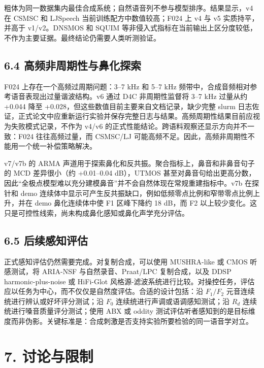 粗体为同一数据集内最佳合成系统；自然语音列不参与模型排序。结果显示，v4
在 CSMSC 和 LJSpeech 当前训练配方中数值较高；F024 上 v4 与 v5
实质持平，并高于 v1/v2。DNSMOS 和 SQUIM
等非侵入式指标在当前输出上区分度较低，不作为主要证据。最终结论仍需要人类听测验证。

\subsection{6.4
高频非周期性与鼻化探索}\label{ux9ad8ux9891ux975eux5468ux671fux6027ux4e0eux9f3bux5316ux63a2ux7d22}

F024 上存在一个高频过周期问题：3--7 kHz 和 5--7 kHz
频带中，合成音频相对参考语音表现出过量谐波结构。v6 通过 D4C
非周期性监督将 3--7 kHz 过量从约 +0.044 降至
+0.028，但这些数值目前主要来自文档记录，缺少完整 slurm
日志佐证，正式论文中应重新运行实验并保存完整日志与结果。高频周期性结果目前应视为失败模式记录，不作为
v4/v6 的正式性能结论。跨语料观察还显示方向并不一致：F024
往往高频过量，而 CSMSC/LJ
可能高频不足。因此，高频非周期性不能用一个统一补偿策略解决。

v7/v7b 的 ARMA 声道用于探索鼻化和反共振。聚合指标上，鼻音和非鼻音句子的
MCD 差异很小（约 +0.01--0.04 dB），UTMOS
甚至对鼻音句给出更高分数，因此``全极点模型难以充分建模鼻音''并不会自然体现在常规重建指标中。v7b
在探针和 demo
连续体中显示可产生反共振缺口，例如低频零点比例和窄带零点比例上升，并在
demo 鼻化连续体中使 F1 区峰下降约 18 dB，而 F2
以上较少变化。这只是可控性线索，尚未构成鼻化感知或鼻化声学充分评估。

\subsection{6.5
后续感知评估}\label{ux540eux7eedux611fux77e5ux8bc4ux4f30}

正式感知评估仍然需要完成。对复制合成，可以使用 MUSHRA-like 或 CMOS
听感测试，将 ARIA-NSF 与自然录音、Praat/LPC 复制合成，以及 DDSP
harmonic-plus-noise 或 HiFi-Glot
风格源-滤波系统进行比较。对操控任务，评估应以任务为中心，而不仅仅是自然度评估。合适的设计包括：沿
\(F_1/F_2\) 元音连续统进行辨认或好坏评分测试；沿 \(F_0\)
连续统进行声调或语调感知测试；沿 \(R_d\)
连续统进行嗓音质量评分测试；使用 ABX 或 oddity
测试评估听者感知到的是目标维度而非伪影。关键标准是：合成刺激是否支持实验所要检验的同一语音学对立。

\section{7. 讨论与限制}\label{ux8ba8ux8bbaux4e0eux9650ux5236}

